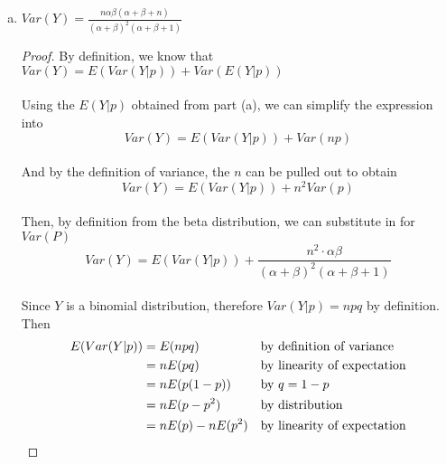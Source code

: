 \documentclass[11pt]{article}
\begin{document}
\begin{enumerate}
\begin{enumerate}[(a)]
\begin{proof}
            \\\\ Thus, the expected value, \(E(Y|p) = n p\) by definition of a binomial distribution.
            \\\\ Therefore, we obtain \(E(n p)\). But, because \(n\) is held constant, we can factor it out by linearity to obtain \(n \cdot E(p)\).
            \\\\ Finally, because \(p\) varies via a beta distribution, we know that \(E(p) = \frac{\alpha}{\alpha + \beta}\) by definition. Thus, \(n E(p) = n \frac{\alpha}{\alpha + \beta}\)
            \\ $$\boxed{\therefore E(Y) = \frac{n \alpha}{\alpha + \beta}}$$
        \end{proof}
        \item \(Var(Y) = \frac{n \alpha \beta (\alpha + \beta + n)}{(\alpha + \beta)^2 (\alpha + \beta + 1)}\)
        \begin{proof}
            By definition, we know that \(Var(Y) = E(Var(Y|p)) + Var(E(Y|p))\)
            \\\\Using the \(E(Y|p)\) obtained from part (a), we can simplify the expression into
            $$Var(Y) = E(Var(Y|p)) + Var(n p)$$
            \\And by the definition of variance, the \(n\) can be pulled out to obtain
            $$Var(Y) = E(Var(Y|p)) + n^2 Var(p)$$
            \\Then, by definition from the beta distribution, we can substitute in for \(Var(P)\)
            $$Var(Y) = E(Var(Y|p)) + \frac{n^2 \cdot \alpha \beta}{(\alpha + \beta)^2 (\alpha + \beta + 1)}$$
            \\Since \(Y\) is a binomial distribution, therefore \(Var(Y|p) = n p q\) by definition. Then
            \begin{align}
                E(Var(Y|p)) &= E(n p q) \notag && \text{by definition of variance}
                \\&= n E(p q) \notag && \text{by linearity of expectation}
                \\&= n E(p (1-p)) \notag && \text{by \(q = 1 - p\)}
                \\&= n E(p - p^2) \notag && \text{by distribution}
                \\&= n E(p) - n E(p^2) \notag && \text{by linearity of expectation}
            \end{align}

\end{proof}
\end{enumerate}
\end{enumerate}
\end{document}
